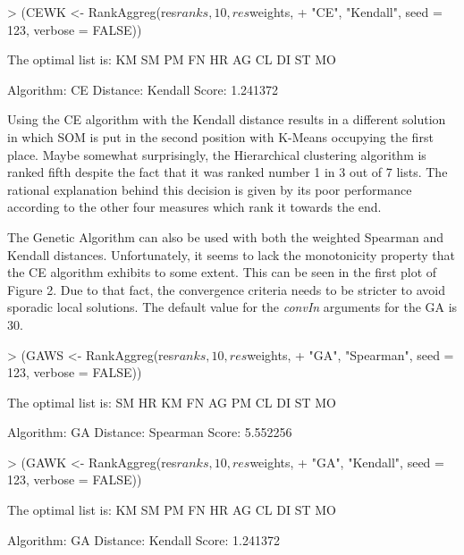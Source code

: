 \documentclass[11pt]{article}
\begin{document}
\begin{Schunk}
\begin{Sinput}
> (CEWK <- RankAggreg(res$ranks, 10, res$weights, 
+     "CE", "Kendall", seed = 123, verbose = FALSE))
\end{Sinput}
\end{Schunk}

\begin{Schunk}
\begin{Soutput}
The optimal list is: 
        KM SM PM FN HR AG CL DI ST MO

  Algorithm:   CE
  Distance:    Kendall
  Score:       1.241372 
\end{Soutput}
\end{Schunk}

Using the CE algorithm with the Kendall distance results in a different solution in which SOM is put in the second
position with K-Means occupying the first place. Maybe somewhat surprisingly, the Hierarchical clustering algorithm is ranked 
fifth despite the fact that it was ranked number 1 in 3 out of 7 lists. The rational explanation behind this decision is given by its
poor performance according to the other four measures which rank it towards the end.

The Genetic Algorithm can also be used with both the weighted Spearman and Kendall distances. Unfortunately, it seems to lack
the monotonicity property that the CE algorithm exhibits to some extent. This can be seen in the first plot of Figure 2.
Due to that fact, the convergence criteria needs to 
be stricter to avoid sporadic local solutions. The default value for the \emph{convIn} arguments for the GA is 30.

\begin{Schunk}
\begin{Sinput}
> (GAWS <- RankAggreg(res$ranks, 10, res$weights, 
+     "GA", "Spearman", seed = 123, verbose = FALSE))
\end{Sinput}
\end{Schunk}
\begin{Schunk}
\begin{Soutput}
The optimal list is: 
        SM HR KM FN AG PM CL DI ST MO

  Algorithm:   GA
  Distance:    Spearman
  Score:       5.552256 
\end{Soutput}
\end{Schunk}

\begin{Schunk}
\begin{Sinput}
> (GAWK <- RankAggreg(res$ranks, 10, res$weights, 
+     "GA", "Kendall", seed = 123, verbose = FALSE))
\end{Sinput}
\end{Schunk}
\begin{Schunk}
\begin{Soutput}
The optimal list is: 
        KM SM PM FN HR AG CL DI ST MO

  Algorithm:   GA
  Distance:    Kendall
  Score:       1.241372 
\end{Soutput}
\end{Schunk}
\end{document}
